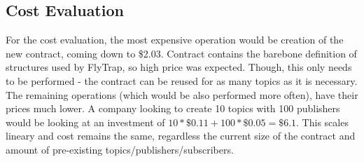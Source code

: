 \subsection{Cost Evaluation}
For the cost evaluation, the most expensive operation would be creation of the new contract, coming down to \$2.03. Contract contains the barebone definition of structures used by FlyTrap, so high price was expected. Though, this only needs to be performed - the contract can be reused for as many topics as it is necessary. The remaining operations (which would be also performed more often), have their prices much lower. A company looking to create 10 topics with 100 publishers would be looking at an investment of $10 * \$0.11 + 100 * \$0.05 = \$6.1$. This scales lineary and cost remains the same, regardless the current size of the contract and amount of pre-existing topics/publishers/subscribers.